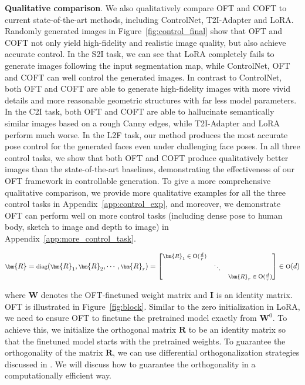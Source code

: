 \textbf{Qualitative comparison}. We also qualitatively compare OFT and COFT to current state-of-the-art methods, including ControlNet, T2I-Adapter and LoRA. Randomly generated images in Figure~\ref{fig:control_final} show that OFT and COFT not only yield high-fidelity and realistic image quality, but also achieve accurate control. In the S2I task, we can see that LoRA completely fails to generate images following the input segmentation map, while ControlNet, OFT and COFT can well control the generated images. In contrast to ControlNet, both OFT and COFT are able to generate high-fidelity images with more vivid details and more reasonable geometric structures with far less model parameters. In the C2I task, both OFT and COFT are able to hallucinate semantically similar images based on a rough Canny edges, while T2I-Adapter and LoRA perform much worse. In the L2F task, our method produces the most accurate pose control for the generated faces even under challenging face poses. In all three control tasks, we show that both OFT and COFT produce qualitatively better images than the state-of-the-art baselines, demonstrating the effectiveness of our OFT framework in controllable generation. To give a more comprehensive qualitative comparison, we provide more qualitative examples for all the three control tasks in Appendix~\ref{app:control_exp}, and moreover, we demonstrate OFT can perform well on more control tasks (including dense pose to human body, sketch to image and depth to image) in Appendix~\ref{app:more_control_task}.

\begin{equation}
    \footnotesize
    \bm{R}=\text{diag}(\bm{R}_1,\bm{R}_2,\cdots,\bm{R}_r)=\begin{bmatrix}
    \bm{R}_1\in \text{O}(\frac{d}{r}) &  &\\
    &\ddots & \\
    & & \bm{R}_r\in \text{O}(\frac{d}{r})
    \end{bmatrix}\in \text{O}(d)
\end{equation}

where $\bm{W}$ denotes the OFT-finetuned weight matrix and $\bm{I}$ is an identity matrix. OFT is illustrated in Figure~\ref{fig:block}. Similar to the zero initialization in LoRA, we need to ensure OFT to finetune the pretrained model exactly from $\bm{W}^0$. To achieve this, we initialize the orthogonal matrix $\bm{R}$ to be an identity matrix so that the finetuned model starts with the pretrained weights. To guarantee the orthogonality of the matrix $\bm{R}$, we can use differential orthogonalization strategies discussed in \cite{liu2021orthogonal,lezcano2019cheap}. We will discuss how to guarantee the orthogonality in a computationally efficient way.

